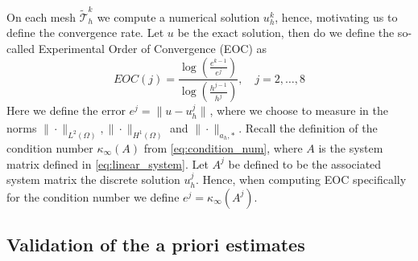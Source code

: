 On each mesh $\widetilde{\mathcal{T}}^{k}_{h}  $ we compute a numerical solution $u_{h}^{k}$, hence, motivating us to define the convergence rate. Let $u $ be the exact solution, then do we define the so-called Experimental Order of Convergence (EOC) as \[
EOC( j) =  \frac{\log \left(  \frac{e^{k-1}}{e^{j}} \right)}{\log \left(  \frac{h^{j-1}}{h^{j}} \right)}, \quad    j = 2,\ldots, 8
\]
Here we define the error $e^{j} = \| u - u_{h}^{j} \|_{  }^{  } $, where we choose to measure in the norms $ \|\cdot   \|_{L^2( \Omega )   }^{  },   \|\cdot   \|_{H^1( \Omega )   }^{  } $ and $ \|\cdot   \|_{ a_{h},* }^{  }$.
Recall the definition of the condition number $\kappa_{\infty} ( A)$ from \eqref{eq:condition_num}, where $A$ is the system matrix defined in \eqref{eq:linear_system}. Let $A^{j}$ be defined to be the associated system matrix the discrete solution
$u_{h}^{j}$. Hence, when computing EOC specifically for the condition number we define $e^{j} = \kappa _{\infty}( A^{j})  $.


\subsection{Validation of the a priori estimates }%
\label{ssub:numerical_results}


